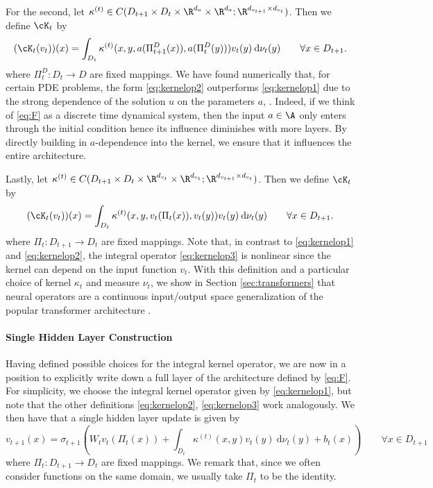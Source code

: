 For the second, let \(\kappa^{(t)} \in C(D_{t+1} \times D_t \times \R^{d_a} \times \R^{d_a}; \R^{d_{v_{t+1}} \times d_{v_t}})\). Then we define \(\cK_t\) by
\begin{equation}
    \label{eq:kernelop2}
    (\cK_t(v_t))(x) = \int_{D_t} \kappa^{(t)} (x,y,a(\Pi_{t+1}^D(x)),a(\Pi_t^D(y))) v_t(y) \: \text{d}\nu_t(y)
    \qquad \forall x \in D_{t+1}.
\end{equation}
where \(\Pi_t^{D} : D_t \to D\) are fixed mappings. We have found numerically that, for certain PDE problems, the form \eqref{eq:kernelop2} outperforms \eqref{eq:kernelop1} due to the strong dependence of the solution \(u\) on the parameters \(a\), . Indeed, if we think of \eqref{eq:F} as a discrete time dynamical system, then the input \(a \in \A\) only enters through the initial condition hence its influence diminishes with more layers. By directly building in \(a\)-dependence into the kernel, we ensure that it influences the entire architecture.

Lastly, let \(\kappa^{(t)} \in C(D_{t+1} \times D_t \times \R^{d_{v_t}} \times \R^{d_{v_t}}; \R^{d_{v_{t+1}} \times d_{v_t}})\). Then we define \(\cK_t\) by
\begin{equation}
    \label{eq:kernelop3}
    (\cK_t(v_t))(x) = \int_{D_t} \kappa^{(t)} (x,y,v_t(\Pi_t(x)),v_t(y)) v_t(y) \: \text{d}\nu_t(y)
    \qquad \forall x \in D_{t+1}.
\end{equation}
where \(\Pi_t : D_{t+1} \to D_t\) are fixed mappings. Note that, in contrast to \eqref{eq:kernelop1} and \eqref{eq:kernelop2}, the integral operator \eqref{eq:kernelop3} is nonlinear since the kernel can depend on the input function \(v_t\). With this definition and a particular choice of kernel \(\kappa_t\) and measure \(\nu_t\), we show in Section \ref{sec:transformers} that neural operators are a continuous input/output space generalization of the popular transformer architecture \citep{vaswani2017attention}. 

\paragraph{Single Hidden Layer Construction} Having defined possible choices for the integral kernel operator, we are now in a position to explicitly write down a full layer of the architecture defined by \eqref{eq:F}. For simplicity, we choose the integral kernel operator given by \eqref{eq:kernelop1}, but note that the other definitions 
\eqref{eq:kernelop2}, \eqref{eq:kernelop3} work analogously. We then have that a single hidden layer update is given by
\begin{equation}
    \label{eq:onelayer}
    v_{t+1}(x) = \sigma_{t+1} \left ( W_t v_t( \Pi_{t} (x)) + \int_{D_t} \kappa^{(t)} (x,y) v_t(y) \: \text{d}\nu_t(y) + b_t(x) \right ) \qquad \forall x \in D_{t+1}
\end{equation}
where \(\Pi_t : D_{t+1} \to D_t\) are fixed mappings. We remark that, since we often consider functions on the same domain, we usually take \(\Pi_t\) to be the identity. 

